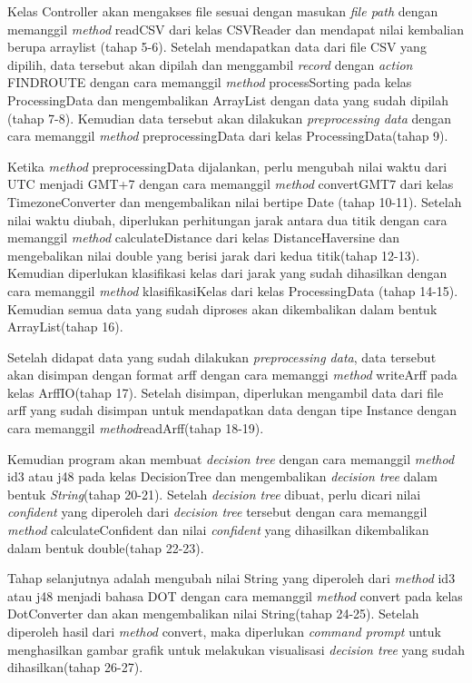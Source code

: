 Kelas Controller akan mengakses file sesuai dengan masukan \textsl{file path} dengan memanggil \textsl{method} readCSV dari kelas CSVReader dan mendapat nilai kembalian berupa arraylist (tahap 5-6). Setelah mendapatkan data dari file CSV yang dipilih, data tersebut akan dipilah dan menggambil \textsl{record} dengan \textsl{action} FINDROUTE dengan cara memanggil \textsl{method} processSorting pada kelas ProcessingData dan mengembalikan ArrayList dengan data yang sudah dipilah (tahap 7-8). Kemudian data tersebut akan dilakukan \textsl{preprocessing data} dengan cara memanggil \textsl{method} preprocessingData dari kelas ProcessingData(tahap 9).

Ketika \textsl{method} preprocessingData dijalankan, perlu mengubah nilai waktu dari UTC menjadi GMT+7 dengan cara memanggil \textsl{method} convertGMT7 dari kelas TimezoneConverter dan mengembalikan nilai bertipe Date (tahap 10-11). Setelah nilai waktu diubah, diperlukan perhitungan jarak antara dua titik dengan cara memanggil \textsl{method} calculateDistance  dari kelas DistanceHaversine dan mengebalikan nilai double yang berisi jarak dari kedua titik(tahap 12-13). Kemudian diperlukan klasifikasi kelas dari jarak yang sudah dihasilkan dengan cara memanggil \textsl{method} klasifikasiKelas dari kelas ProcessingData (tahap 14-15). Kemudian semua data yang sudah diproses akan dikembalikan dalam bentuk ArrayList(tahap 16).

Setelah didapat data yang sudah dilakukan \textsl{preprocessing data}, data tersebut akan disimpan dengan format arff dengan cara memanggi \textsl{method} writeArff pada kelas ArffIO(tahap 17). Setelah disimpan, diperlukan mengambil data dari file arff yang sudah disimpan untuk mendapatkan data dengan tipe Instance dengan cara memanggil \textsl{method}readArff(tahap 18-19).

Kemudian program akan membuat \textsl{decision tree} dengan cara memanggil \textsl{method} id3 atau j48 pada kelas DecisionTree dan mengembalikan \textsl{decision tree} dalam bentuk \textsl{String}(tahap 20-21). Setelah \textsl{decision tree} dibuat, perlu dicari nilai \textsl{confident} yang diperoleh dari \textsl{decision tree} tersebut dengan cara memanggil \textsl{method} calculateConfident dan nilai \textsl{confident} yang dihasilkan dikembalikan dalam bentuk double(tahap 22-23).

Tahap selanjutnya adalah mengubah nilai String yang diperoleh dari \textsl{method} id3 atau j48 menjadi bahasa DOT dengan cara memanggil \textsl{method} convert pada kelas DotConverter dan akan mengembalikan nilai String(tahap 24-25). Setelah diperoleh hasil dari \textsl{method} convert, maka diperlukan \textsl{command prompt} untuk menghasilkan gambar grafik untuk melakukan visualisasi \textsl{decision tree} yang sudah dihasilkan(tahap 26-27).

